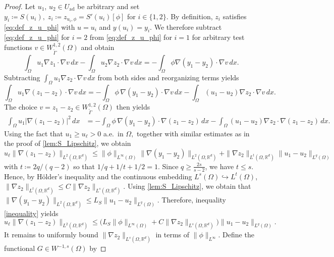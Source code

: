 \documentclass[10pt,a4paper]{amsart}
\newcommand{\R}{\mathbb{R}}
\newcommand{\feas}{U_{\textrm{ad}}}
\begin{document}
\begin{proof}
 Let $u_1$, $u_2\in \feas$ be arbitrary and set
$ y_i \coloneqq S(u_i),\; z_i \coloneqq z_{u_i,\phi} = S'(u_i)[\phi]
$
for $i \in \{1,2\}$. By definition, $z_i$ satisfies \eqref{eq:def_z_u_phi} with $u=u_i$ and $y(u_i)=y_i$.
We therefore subtract \eqref{eq:def_z_u_phi} for $i = 2$ from \eqref{eq:def_z_u_phi} for $i = 1$
for arbitrary test functions $v\in W^{1,2}_{\tilde\Gamma}(\Omega)$ and obtain
%
\begin{equation*}
\int_\Omega u_1 \nabla z_1\cdot\nabla v\,dx
-\int_\Omega u_2 \nabla z_2\cdot\nabla v\,dx
=
-\int_\Omega \phi \nabla (y_1-y_2)\cdot\nabla v\,dx.
\end{equation*}
%
Subtracting $\int_\Omega u_1\nabla z_2\cdot\nabla v\,dx$ from both sides and reorganizing terms yields
%
\begin{equation*}
\int_\Omega u_1\nabla(z_1-z_2)\cdot\nabla v\,dx
=
-\int_\Omega \phi\,\nabla(y_1-y_2)\cdot\nabla v\,dx
-\int_\Omega (u_1-u_2)\nabla z_2\cdot\nabla v\,dx.
\end{equation*}
%
The choice $v=z_1-z_2\in W^{1,2}_{\tilde\Gamma}(\Omega)$ then yields
%
\begin{align*}
\int_\Omega u_1|\nabla(z_1-z_2)|^2\,dx
&=
-\int_\Omega \phi\,\nabla(y_1-y_2)\cdot\nabla(z_1-z_2)\,dx
-\int_\Omega (u_1-u_2)\nabla z_2\cdot\nabla(z_1-z_2)\,dx.
\end{align*}
%
Using the fact that $u_1\ge u_\ell>0$ a.e.\ in $\Omega,$ together with similar estimates
as in the proof of \cref{lem:S_Lipschitz}, we obtain
%
\begin{equation} \label{inequality}
u_\ell\|\nabla(z_1-z_2)\|_{L^2(\Omega,\R^d)}
\le 
\|\phi\|_{L^\infty(\Omega)} \|\nabla(y_1-y_2)\|_{L^2(\Omega,\R^d)}
+ \|\nabla z_2\|_{L^{t}(\Omega,\R^d)}\|u_1-u_2\|_{L^q(\Omega)}
\end{equation}
%
with $t \coloneqq 2q/(q-2)$ so that $1/q+1/t+1/2=1.$ Since \(q\ge \frac{2s}{s-2}\), we have \(t\le s\). Hence, by H\"older's inequality and the continuous embedding \(L^s(\Omega)\hookrightarrow L^t(\Omega)\),  $
\|\nabla z_2\|_{L^t(\Omega,\mathbb{R}^d)}
\le C\|\nabla z_2\|_{L^s(\Omega,\mathbb{R}^d)}.$ 
Using \cref{lem:S_Lipschitz}, we obtain that $
\|\nabla(y_1-y_2)\|_{L^2(\Omega,\mathbb{R}^d)}
\le L_S\|u_1-u_2\|_{L^q(\Omega)}.$ 
Therefore, inequality \eqref{inequality} yields
\[
u_\ell\|\nabla(z_1-z_2)\|_{L^2(\Omega,\mathbb{R}^d)}
\le
\Big(
L_S\|\phi\|_{L^\infty(\Omega)}
+
C\|\nabla z_2\|_{L^s(\Omega,\mathbb{R}^d)}
\Big)
\|u_1-u_2\|_{L^q(\Omega)}.
\]
It remains to uniformly bound $\|\nabla z_2\|_{L^s(\Omega,\mathbb{R}^d)}$ in terms of $\| \phi \|_{L^{\infty}}.$ Define the functional $G\in W^{-1,s}(\Omega)$ by

\end{proof}
\end{document}
